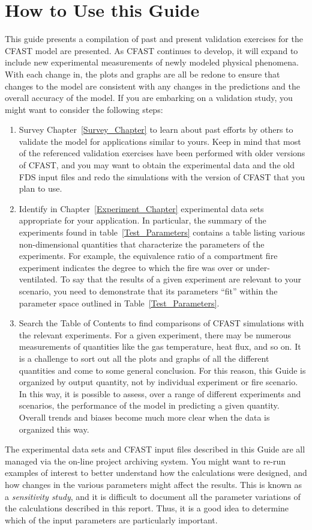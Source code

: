 \section{How to Use this Guide}

 This guide presents a compilation of past and present validation exercises for the CFAST model are presented.  As CFAST continues to develop, it will expand to include new experimental
measurements of newly modeled physical phenomena. With each change in,
the plots and graphs are all be redone to ensure that changes to the model are consistent with any changes in the predictions and the overall accuracy of the model. If you are embarking on a validation study, you might want to consider the following steps:
\begin{enumerate}
\item Survey Chapter~\ref{Survey_Chapter} to learn about past efforts by others to validate the model for
applications similar to yours. Keep in mind that most of the referenced validation exercises have been performed with
older versions of CFAST, and you may want to obtain the experimental data and the old FDS input files and redo the
simulations with the version of CFAST that you plan to use.
\item Identify in Chapter~\ref{Experiment_Chapter} experimental data sets appropriate for your application. In particular,
the summary of the experiments found in table~\ref{Test_Parameters} contains a table listing various non-dimensional
quantities that characterize the parameters of the experiments. For example, the equivalence ratio of a compartment fire
experiment indicates the degree to which the fire was over or under-ventilated.
To say that the results of a given experiment are relevant to
your scenario, you need to demonstrate that its parameters ``fit'' within the parameter space outlined in
Table~\ref{Test_Parameters}.
\item Search the Table of Contents to find comparisons of CFAST simulations with the relevant experiments.
For a given experiment, there may be numerous measurements of quantities like the gas temperature,
heat flux, and so on.
It is a challenge to sort out all the plots and graphs of all the different quantities and come to some general conclusion.
For this reason, this Guide is organized by output quantity, not by individual experiment or fire scenario.
In this way, it is possible to assess, over a range of
different experiments and scenarios, the performance of the model in predicting a given quantity.
Overall trends and biases become much more clear when the data is organized this way.
\end{enumerate}
The experimental data sets and CFAST input files described in this Guide are all managed via the on-line project archiving system.
You might want to re-run examples of interest
to better understand how the calculations were designed, and how changes in the various parameters might affect the results.
This is known as a {\em sensitivity study},
and it is difficult to document all the parameter variations of the calculations described in this report.
Thus, it is a good idea to determine which of the input parameters are particularly important.

